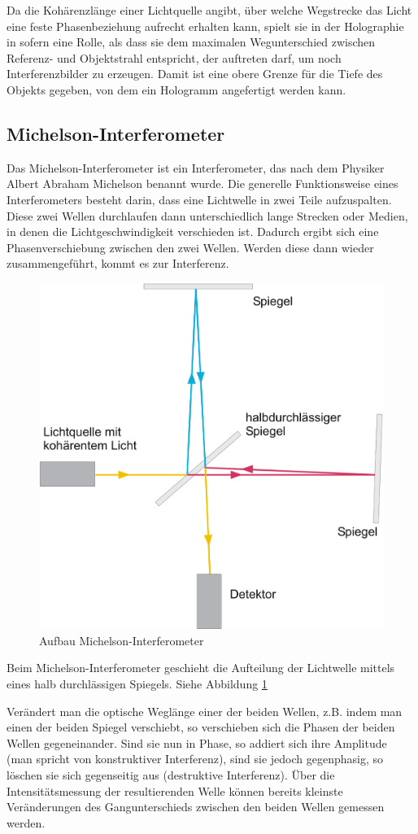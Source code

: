 \documentclass[12pt]{article}
\begin{document}
Da die Kohärenzlänge einer Lichtquelle angibt, über welche Wegstrecke das Licht eine feste
Phasenbeziehung aufrecht erhalten kann, spielt sie in der Holographie in sofern eine Rolle, als
dass sie dem maximalen Wegunterschied zwischen Referenz- und Objektstrahl entspricht, der
auftreten darf, um noch Interferenzbilder zu erzeugen. Damit ist eine obere Grenze für die Tiefe
des Objekts gegeben, von dem ein Hologramm angefertigt werden kann.

\subsection{Michelson-Interferometer}
Das Michelson-Interferometer ist ein Interferometer, das nach dem Physiker Albert Abraham Michelson benannt wurde. 
Die generelle Funktionsweise eines Interferometers besteht darin, dass eine Lichtwelle in zwei Teile aufzuspalten. Diese zwei Wellen durchlaufen dann
unterschiedlich lange Strecken oder Medien, in denen die Lichtgeschwindigkeit verschieden ist. Dadurch ergibt sich eine Phasenverschiebung zwischen den
zwei Wellen. Werden diese dann wieder zusammengeführt, kommt es zur Interferenz.
\begin{figure}[h]
 \centering
 \includegraphics[width=0.5\linewidth]{pictures/michelson.eps}
 \caption{Aufbau Michelson-Interferometer}
 \label{michelson}
\end{figure}
Beim Michelson-Interferometer geschieht die Aufteilung der Lichtwelle mittels eines halb durchlässigen Spiegels. Siehe Abbildung \ref{michelson}

Verändert man die optische Weglänge einer der beiden Wellen, z.B. indem man einen der beiden Spiegel verschiebt, so verschieben sich die Phasen der beiden
Wellen gegeneinander. Sind sie nun in Phase, so addiert sich ihre Amplitude (man spricht von konstruktiver Interferenz), sind sie jedoch gegenphasig, so
löschen sie sich gegenseitig aus (destruktive Interferenz). Über die Intensitätsmessung der resultierenden Welle können bereits kleinste Veränderungen des
Gangunterschieds zwischen den beiden Wellen gemessen werden.
\end{document}

